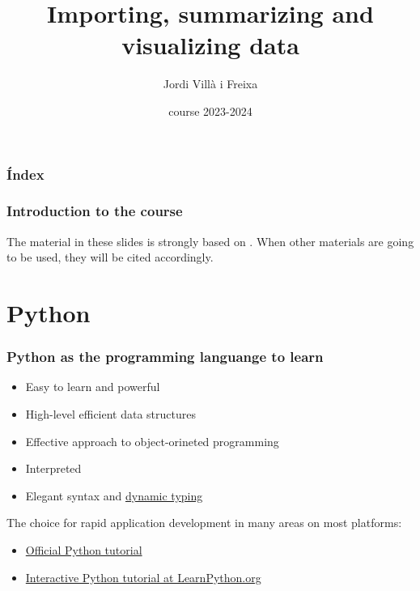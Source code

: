 \documentclass{beamer}
\title[Introduction]{Importing, summarizing and visualizing data} %
\author{Jordi Villà i Freixa} %
\institute[FCTE] %
{
Universitat de Vic - Universitat Central de Catalunya \\
Study Abroad\\ %
\medskip
\textit{jordi.villa@uvic.cat} %
}
\date{course 2023-2024}
\begin{document}
\begin{frame}
\titlepage %
\end{frame}

\begin{frame}
\frametitle{Índex} %
\tableofcontents %
\end{frame}


\begin{frame}
  \frametitle{Introduction to the course}
  The material in these slides is strongly based on \cite{kroese2020}. When other materials are going to be used, they will be cited accordingly.
  \end{frame}


\section{Python} %

\begin{frame}
  \frametitle{Python as the programming languange to learn}
  \begin{itemize}
    \item Easy to learn and powerful
    \item High-level efficient data structures
    \item Effective approach to object-orineted programming
    \item Interpreted
    \item Elegant syntax and \href{https://www.educative.io/answers/what-is-dynamic-typing}{dynamic typing}
  \end{itemize}
  The choice for rapid application development in many areas on most platforms:
  \begin{itemize}
    \item \href{https://docs.python.org/3/tutorial/index.html}{Official Python tutorial}
    \item \href{https://www.learnpython.org}{Interactive Python tutorial at LearnPython.org}
  \end{itemize}
\end{frame}
\end{document}

